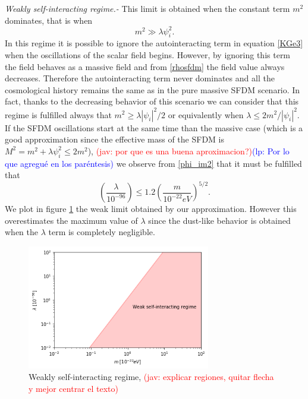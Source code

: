 \documentclass[amssymb,twocolumn,prd,nofootinbib,showpacs]{revtex4-1}
\newcommand{\jav}[1]{\textcolor{red}{(jav: #1)}}
\newcommand{\lp}[1]{\textcolor{blue}{(lp: #1)}}
\begin{document}
\textit{Weakly self-interacting regime.-} This limit is obtained when the constant term $m^2$ dominates, 
that is when
%
\begin{equation}\label{consw}
m^2\gg \lambda\psi_i^2.
\end{equation}
In this regime it is possible to ignore the autointeracting term in equation \eqref{KGe3} when the oscillations 
of the scalar field begins. 
However, by ignoring this term the field behaves as a massive field and from
\eqref{rhosfdm} the field value always decreases. Therefore the autointeracting term never dominates and 
all the cosmological history remains the same as in the pure massive SFDM scenario.  In fact, thanks to the 
decreasing behavior of this scenario we can consider that this regime is fulfilled always that 
$m^2\geq \lambda|\psi_i|^2/2$ or equivalently when $\lambda\leq 2m^2/|\psi_i|^2$. 
%
If the SFDM oscillations start at the same time than the massive case (which is a good approximation since the effective mass of the SFDM is $M^2 =m^2 +\lambda\psi^2_i \leq 2m^2$), \jav{por que es una buena aproximacion?}\lp{Por lo que agregu\'e en los par\'entesis} we observe from \eqref{phi_im2} that it must be fulfilled that
%
\begin{equation}
\left(\frac{\lambda}{10^{-96}}\right)\leq 1.2\left(\frac{m}{10^{-22}eV}\right)^{5/2}.
\end{equation}
We plot in figure \ref{weekregime} the weak limit obtained by our approximation. However this overestimates the maximum value of $\lambda$ since the dust-like behavior is obtained when the $\lambda$ term is completely negligible.%
\begin{figure}[h!]
\includegraphics[width=8cm]{weakregime.png}
\caption{Weakly self-interacting regime, \jav{explicar regiones, quitar flecha y mejor centrar el texto}}
\label{weekregime}
\end{figure} 
\end{document}
